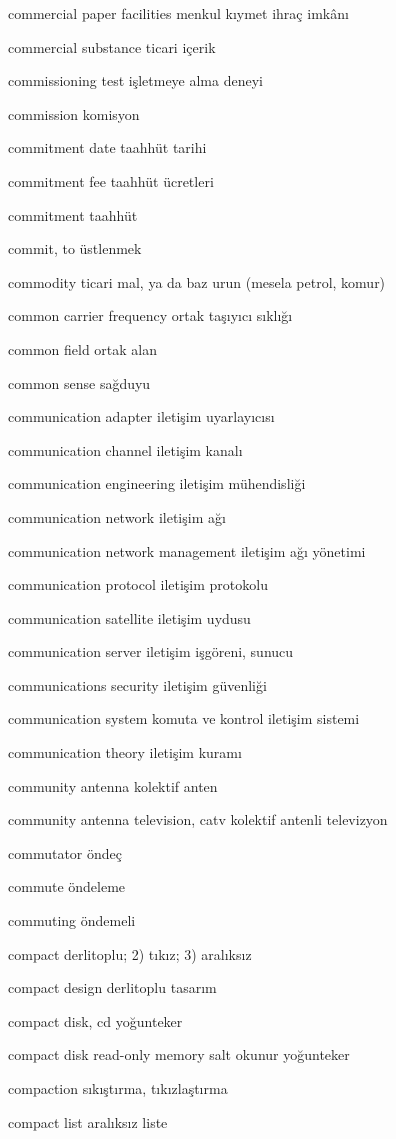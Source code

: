 \documentclass[12pt,fleqn]{article}\usepackage{../../common}
\begin{document}
commercial paper facilities menkul kıymet ihraç imkânı

commercial substance ticari içerik

commissioning test işletmeye alma deneyi

commission komisyon

commitment date taahhüt tarihi

commitment fee taahhüt ücretleri

commitment taahhüt

commit, to üstlenmek

commodity ticari mal, ya da baz urun (mesela petrol, komur)

common carrier frequency ortak taşıyıcı sıklığı

common field ortak alan

common sense sağduyu

communication adapter iletişim uyarlayıcısı

communication channel iletişim kanalı

communication engineering iletişim mühendisliği

communication network iletişim ağı

communication network management iletişim ağı yönetimi

communication protocol iletişim protokolu

communication satellite iletişim uydusu

communication server iletişim işgöreni, sunucu

communications security iletişim güvenliği

communication system komuta ve kontrol iletişim sistemi

communication theory iletişim kuramı

community antenna kolektif anten

community antenna television, catv kolektif antenli televizyon

commutator öndeç

commute öndeleme

commuting öndemeli

compact derlitoplu; 2) tıkız; 3) aralıksız

compact design derlitoplu tasarım

compact disk, cd yoğunteker

compact disk read-only memory salt okunur yoğunteker

compaction sıkıştırma, tıkızlaştırma

compact list aralıksız liste
\end{document}
